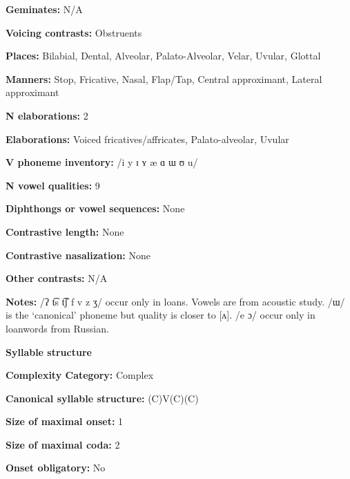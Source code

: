 \textbf{Geminates:} N/A



\textbf{Voicing contrasts:} Obstruents



\textbf{Places:} Bilabial, Dental, Alveolar, Palato-Alveolar, Velar, Uvular, Glottal



\textbf{Manners:} Stop, Fricative, Nasal, Flap/Tap, Central approximant, Lateral approximant



\textbf{N elaborations:} 2



\textbf{Elaborations:} Voiced fricatives/affricates, Palato-alveolar, Uvular



\textbf{V phoneme inventory:} /i y ɪ ʏ æ ɑ ɯ ʊ u/



\textbf{N vowel qualities:} 9



\textbf{Diphthongs or vowel sequences:} None



\textbf{Contrastive length:} None



\textbf{Contrastive nasalization:} None



\textbf{Other contrasts:} N/A



\textbf{Notes:} /ʔ t͡s t͡ʃ f v z ʒ/ occur only in loans. Vowels are from \citet{CarterRobbins2016} acoustic study. /ɯ/ is the ‘canonical’ phoneme but quality is closer to [ʌ]. /e ɔ/ occur only in loanwords from Russian.



\textbf{Syllable structure}



\textbf{Complexity Category:} Complex



\textbf{Canonical syllable structure:} (C)V(C)(C) \citep[12-18]{Poppe1964}



\textbf{Size of maximal onset:} 1



\textbf{Size of maximal coda:} 2



\textbf{Onset obligatory:} No



